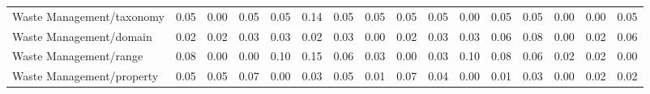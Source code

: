 \begin{tabular}{lccccccccccccccc}
Waste Management/taxonomy & 0.05 & 0.00 & 0.05 & 0.05 & 0.14 & 0.05 & 0.05 & 0.05 & 0.05 & 0.00 & 0.05 & 0.05 & 0.00 & 0.00 & 0.05 \\
Waste Management/domain & 0.02 & 0.02 & 0.03 & 0.03 & 0.02 & 0.03 & 0.00 & 0.02 & 0.03 & 0.03 & 0.06 & 0.08 & 0.00 & 0.02 & 0.06 \\
Waste Management/range & 0.08 & 0.00 & 0.00 & 0.10 & 0.15 & 0.06 & 0.03 & 0.00 & 0.03 & 0.10 & 0.08 & 0.06 & 0.02 & 0.02 & 0.00 \\
Waste Management/property & 0.05 & 0.05 & 0.07 & 0.00 & 0.03 & 0.05 & 0.01 & 0.07 & 0.04 & 0.00 & 0.01 & 0.03 & 0.00 & 0.02 & 0.02 \\
\bottomrule
\end{tabular}
